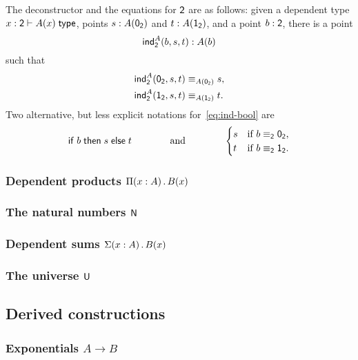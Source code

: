 \documentclass{article}
\begin{document}
The deconstructor and the equations for $\mathsf{2}$ are as follows: given a
dependent type $x : \mathsf{2} \vdash A(x)\; \mathsf{type}$, points $s : A(\mathsf{0}_{\mathsf{2}})$ and
$t : A(\mathsf{1}_{\mathsf{2}})$, and a point $b : \mathsf{2}$, there is a point
%
\begin{equation}
  \label{eq:ind-bool}%
  \ind{\Bool}^A(b, s, t) : A(b)
\end{equation}
%
such that
%
\begin{align*}
  \mathsf{ind}_{\mathsf{2}}^A(\mathsf{0}_{\mathsf{2}}, s, t) &\equiv_{A(\mathsf{0}_{\mathsf{2}})} s, \\
  \mathsf{ind}_{\mathsf{2}}^A(\mathsf{1}_{\mathsf{2}}, s, t) &\equiv_{A(\mathsf{1}_{\mathsf{2}})} t.
\end{align*}
%
Two alternative, but less explicit notations for~\eqref{eq:ind-bool} are
%
\begin{equation*}
  \mathsf{if}\;b\;\mathsf{then}\;s\;\mathsf{else}\;t
  \qquad
  \qquad
  \text{and}
  \qquad
  \qquad
  \begin{cases}
    s & \text{if $b \equiv_{\mathsf{2}} \mathsf{0}_{\mathsf{2}}$,} \\
    t & \text{if $b \equiv_{\mathsf{2}} \mathsf{1}_{\mathsf{2}}$.}
  \end{cases}
\end{equation*}
%



\subsubsection{Dependent products $\Pi(x : A) \,.\, B(x)$}

\subsubsection{The natural numbers $\mathsf{N}$}

\subsubsection{Dependent sums $\Sigma(x : A) \,.\, B(x)$}

\subsubsection{The universe $\mathsf{U}$}


\subsection{Derived constructions}

\subsubsection{Exponentials $A \to B$}
\end{document}
